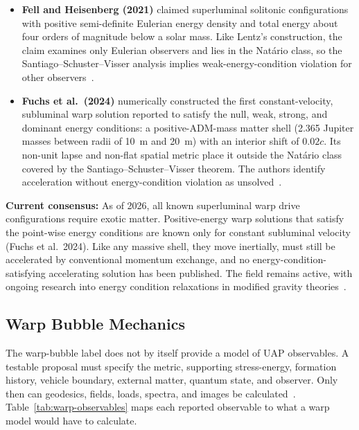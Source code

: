 \documentclass[aps,prd,twocolumn,superscriptaddress,nofootinbib,floatfix]{revtex4-2}
\begin{document}
\begin{itemize}
        symmetric example. Bobrick and Martire also argue that every warp drive,
        positive-energy or not, must be accelerated by conventional momentum
        exchange: the shell moves inertially and supplies no propulsion of its
        own~\cite{BobrickMartire2021,SantiagoVisser2022}.
  \item \textbf{Fell and Heisenberg (2021)} claimed superluminal solitonic
        configurations with positive semi-definite Eulerian energy density and
        total energy about four orders of magnitude below a solar mass. Like
        Lentz's construction, the claim examines only Eulerian observers and lies
        in the Nat\'ario class, so the Santiago--Schuster--Visser analysis implies
        weak-energy-condition violation for other
        observers~\cite{FellHeisenberg2021,SantiagoVisser2022}.
  \item \textbf{Fuchs et al.\ (2024)} numerically constructed the first
        constant-velocity, subluminal warp solution reported to satisfy the null,
        weak, strong, and dominant energy conditions: a positive-ADM-mass matter
        shell (2.365 Jupiter masses between radii of \SI{10}{m} and \SI{20}{m})
        with an interior shift of $0.02c$. Its non-unit lapse and non-flat
        spatial metric place it outside the Nat\'ario class covered by the
        Santiago--Schuster--Visser theorem. The authors identify acceleration
        without energy-condition violation as unsolved~\cite{Fuchs2024}.
\end{itemize}

\textbf{Current consensus:} As of 2026, all known superluminal warp drive
configurations require exotic matter. Positive-energy warp solutions that satisfy
the point-wise energy conditions are known only for constant subluminal velocity
(Fuchs et al.\ 2024). Like any massive shell, they move inertially, must still be
accelerated by conventional momentum exchange, and no
energy-condition-satisfying accelerating solution has been published. The field
remains active, with ongoing research into energy condition relaxations in
modified gravity
theories~\cite{Lentz2021,SantiagoVisser2022,BobrickMartire2021,FellHeisenberg2021,Fuchs2024}.

\subsection{Warp Bubble Mechanics}\label{sec:warp-bubble}

The warp-bubble label does not by itself provide a model of UAP observables. A
testable proposal must specify the metric, supporting stress-energy, formation
history, vehicle boundary, external matter, quantum state, and observer. Only then
can geodesics, fields, loads, spectra, and images be
calculated~\cite{Alcubierre1994,MTW1973,Wald1984}.
Table~\ref{tab:warp-observables} maps each reported observable to what a warp
model would have to calculate.
\end{document}
